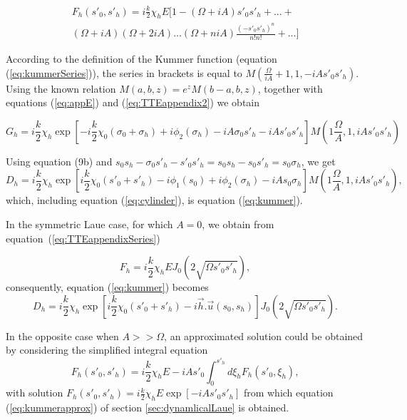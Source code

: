 \documentclass[preprint]{iucr}              %
\newcommand{\inred}[1]{{\color{red}#1}}
\begin{document}
\begin{align}
    \label{eq:TTEappendixSeries}
    F_h(s'_0,s'_h) = i\frac{k}{2}\chi_h E [ 1 - 
    (\Omega+i A) s'_0s'_h + ...+
    \nonumber \\
    (\Omega+iA)(\Omega+2iA)...(\Omega+niA)
    \frac{(-s'_0 s'_h)^n}{n!n!}
    +...]
\end{align}

\inred{According to the definition of the Kummer function (equation (\ref{eq:kummerSeries})), the series \inred{in brackets} is equal to $M(\frac{\Omega}{iA}+1, 1, -iA s'_0 s'_h)$. Using the known relation
$M(a,b,z)=e^z M(b-a,b,z)$, together with equations (\ref{eq:appE}) and (\ref{eq:TTEappendix2}) we obtain

\begin{equation}
    G_h = i\frac{k}{2}\chi_h \exp\left[-i \frac{k}{2} \chi_0 (\sigma_0+\sigma_h)+ i \phi_2(\sigma_h)-i A \sigma_0 s'_h - i A s'_0 s'_h\right] M(1\frac{\Omega}{A},1,i A s'_0 s'_h)
\end{equation}

Using equation (9b) and $s_0s_h-\sigma_0 s'_h - s'_0 s'_h=s_0 s_h - s_0 s'_h = s_0 \sigma_h$, we get
\begin{equation}
    D_h = i \frac{k}{2} \chi_h \exp\left[  i \frac{k}{2} \chi_0 (s'_0+s'_h) - i\phi_1(s_0) + i \phi_2(\sigma_h) - iA s_0 \sigma_h \right] M(1\frac{\Omega}{A},1,i A s'_0 s'_h), 
\end{equation}
which, including equation (\ref{eq:cylinder}), is equation (\ref{eq:kummer}).

In the symmetric Laue case, for which $A=0$, we obtain from equation~(\ref{eq:TTEappendixSeries})

\begin{equation}
    F_h = i \frac{k}{2} \chi_h E J_0(2 \sqrt{\Omega s'_0 s'_h}),
\end{equation}
consequently, equation (\ref{eq:kummer}) becomes
\begin{equation}
    D_h = i \frac{k}{2} \chi_h \exp\left[  i \frac{k}{2} \chi_0 (s'_0+s'_h) - i \vec h . \vec u(s_0,s_h) \right] J_0(2\sqrt{\Omega s'_0 s'_h}).
\end{equation}


In the opposite case when $A >> \Omega$, an approximated solution could be obtained by considering the simplified integral equation
\begin{equation}
        F_h(s'_0,s'_h) = i\frac{k}{2}\chi_h E - i A s'_0 \int_0^{s'_h} d\xi_h F_h(s'_0,\xi_h),
\end{equation}
with solution $F_h(s'_0,s'_h) = i\frac{k}{2}\chi_h E \exp[-i A s'_0 s'_h]$ from which equation (\ref{eq:kummerapprox}) of section \ref{sec:dynamlicalLaue} is obtained.
}
\end{document}
